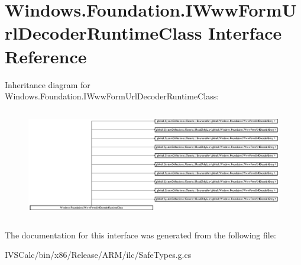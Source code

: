 \hypertarget{interface_windows_1_1_foundation_1_1_i_www_form_url_decoder_runtime_class}{}\section{Windows.\+Foundation.\+I\+Www\+Form\+Url\+Decoder\+Runtime\+Class Interface Reference}
\label{interface_windows_1_1_foundation_1_1_i_www_form_url_decoder_runtime_class}
Inheritance diagram for Windows.\+Foundation.\+I\+Www\+Form\+Url\+Decoder\+Runtime\+Class\+:\begin{figure}[H]
\begin{center}
\leavevmode
\includegraphics[height=4.827586cm]{interface_windows_1_1_foundation_1_1_i_www_form_url_decoder_runtime_class}
\end{center}
\end{figure}


The documentation for this interface was generated from the following file\+:\begin{DoxyCompactItemize}
\item 
I\+V\+S\+Calc/bin/x86/\+Release/\+A\+R\+M/ilc/Safe\+Types.\+g.\+cs\end{DoxyCompactItemize}
